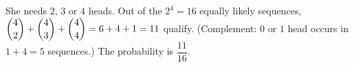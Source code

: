 She needs $2$, $3$ or $4$ heads. Out of the $2^4=16$ equally likely sequences, $\dbinom42+\dbinom43+\dbinom44=6+4+1=11$ qualify. (Complement: $0$ or $1$ head occurs in $1+4=5$ sequences.) The probability is $\boxed{\dfrac{11}{16}}$.
